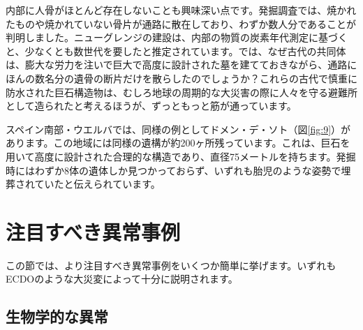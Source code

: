 \documentclass[10pt,twocolumn,letterpaper]{article}
\begin{document}
内部に人骨がほとんど存在しないことも興味深い点です。発掘調査では、焼かれたものや焼かれていない骨片が通路に散在しており、わずか数人分であることが判明しました。ニューグレンジの建設は、内部の物質の炭素年代測定に基づくと、少なくとも数世代を要したと推定されています。では、なぜ古代の共同体は、膨大な労力を注いで巨大で高度に設計された墓を建てておきながら、通路にほんの数名分の遺骨の断片だけを散らしたのでしょうか？これらの古代で慎重に防水された巨石構造物は、むしろ地球の周期的な大災害の際に人々を守る避難所として造られたと考えるほうが、ずっともっと筋が通っています。

スペイン南部・ウエルバでは、同様の例としてドメン・デ・ソト（図\ref{fig:9}）があります。この地域には同様の遺構が約200ヶ所残っています\cite{72,32}。これは、巨石を用いて高度に設計された合理的な構造であり、直径75メートルを持ちます。発掘時にはわずか8体の遺体しか見つかっておらず、いずれも胎児のような姿勢で埋葬されていたと伝えられています。

\section{注目すべき異常事例}

この節では、より注目すべき異常事例をいくつか簡単に挙げます。いずれもECDOのような大災変によって十分に説明されます。

\subsection{生物学的な異常}
\end{document}
